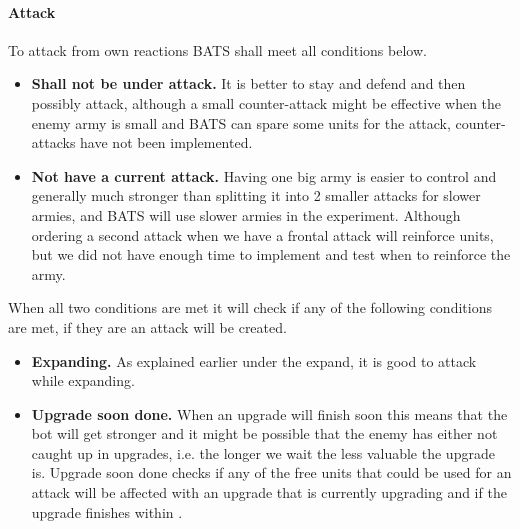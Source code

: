 \paragraph{Attack}
To attack from own reactions BATS shall meet all conditions below.
\begin{itemize}
  \item \textbf{Shall not be under attack.} It is better to stay and defend and then possibly
	attack, although a small counter-attack might be effective when the enemy army is small and BATS
	can spare some units for the attack, counter-attacks have not been implemented.
  \item \textbf{Not have a current attack.} Having one big army is easier to control and generally
	much stronger than splitting it into 2 smaller attacks for slower armies\cite{day9}, and BATS will
	use slower armies in the experiment. Although ordering a second attack when we have a frontal attack will
	reinforce units, but we did not have enough time to implement and test when to reinforce the
	army.
\end{itemize}
When all two conditions are met it will check if any of the following conditions are met, if they
are an attack will be created.
\begin{itemize}
	\item \textbf{Expanding.} As explained earlier under the expand, it is good to attack while
		expanding.
	\item \textbf{Upgrade soon done.} When an upgrade will finish soon this means that the bot will
		get stronger and it might be possible that the enemy has either not caught up in upgrades, i.e.
		the longer we wait the less valuable the upgrade is\cite{day9}. Upgrade soon done checks if any
		of the free units that could be used for an attack will be affected with an upgrade that is
		currently upgrading and if the upgrade finishes within \classificationUpgradeSoonDone.
\end{itemize}


